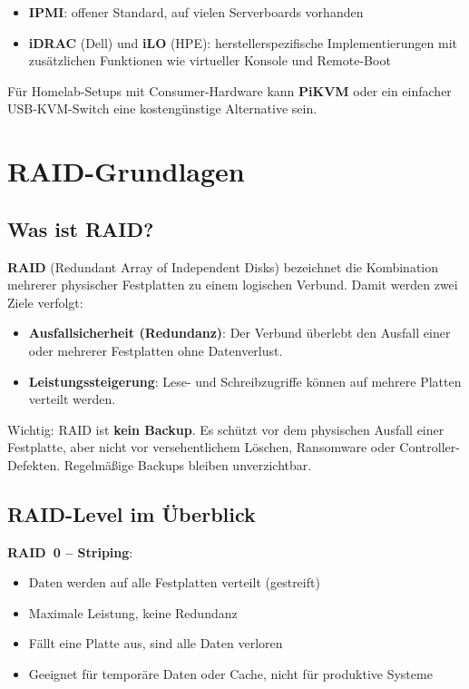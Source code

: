 \documentclass[11pt, oneside, numbers=noenddot]{scrbook}
\begin{document}
\begin{itemize}
  \item \textbf{IPMI}: offener Standard, auf vielen Serverboards vorhanden
  \item \textbf{iDRAC} (Dell) und \textbf{iLO} (HPE): herstellerspezifische Implementierungen mit zusätzlichen Funktionen wie virtueller Konsole und Remote-Boot
\end{itemize}

Für Homelab-Setups mit Consumer-Hardware kann \textbf{PiKVM} oder ein einfacher USB-KVM-Switch eine kostengünstige Alternative sein.



\chapter{RAID-Grundlagen}

\section{Was ist RAID?}
\textbf{RAID} (Redundant Array of Independent Disks) bezeichnet die Kombination mehrerer physischer Festplatten zu einem logischen Verbund. Damit werden zwei Ziele verfolgt:

\begin{itemize}
  \item \textbf{Ausfallsicherheit (Redundanz)}: Der Verbund überlebt den Ausfall einer oder mehrerer Festplatten ohne Datenverlust.
  \item \textbf{Leistungssteigerung}: Lese- und Schreibzugriffe können auf mehrere Platten verteilt werden.
\end{itemize}

Wichtig: RAID ist \textbf{kein Backup}. Es schützt vor dem physischen Ausfall einer Festplatte, aber nicht vor versehentlichem Löschen, Ransomware oder Controller-Defekten. Regelmäßige Backups bleiben unverzichtbar.

\section{RAID-Level im Überblick}

\textbf{RAID~0 -- Striping}:
\begin{itemize}
  \item Daten werden auf alle Festplatten verteilt (gestreift)
  \item Maximale Leistung, keine Redundanz
  \item Fällt eine Platte aus, sind alle Daten verloren
  \item Geeignet für temporäre Daten oder Cache, nicht für produktive Systeme
\end{itemize}
\end{document}
